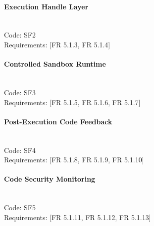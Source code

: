 \documentclass{article}
\begin{document}
\paragraph{Execution Handle Layer}  \mbox{} \\
\noindent Code: SF2 \\
\noindent Requirements: [FR 5.1.3, FR 5.1.4]

\paragraph{Controlled Sandbox Runtime} \mbox{} \\
\noindent Code: SF3 \\
\noindent Requirements: [FR 5.1.5, FR 5.1.6, FR 5.1.7]

\paragraph{Post-Execution Code Feedback} \mbox{} \\
\noindent Code: SF4 \\
\noindent Requirements: [FR 5.1.8, FR 5.1.9, FR 5.1.10]

\paragraph{Code Security Monitoring} \mbox{} \\
\noindent Code: SF5 \\
\noindent Requirements: [FR 5.1.11, FR 5.1.12, FR 5.1.13]
\end{document}
